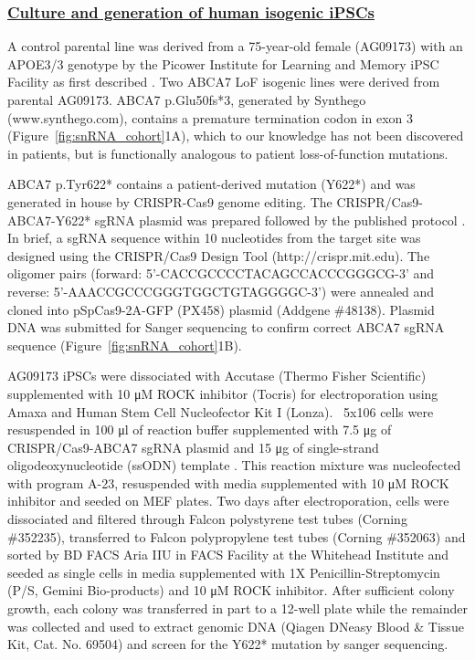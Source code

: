 \subsubsection{\underline{Culture and generation of human isogenic iPSCs}} 

A control parental line was derived from a 75-year-old female (AG09173) with an APOE3/3 genotype by the Picower Institute for Learning and Memory iPSC Facility as first described \supercite{Lin2018-ma}. Two ABCA7 LoF isogenic lines were derived from parental AG09173. ABCA7 p.Glu50fs*3, generated by Synthego (www.synthego.com), contains a premature termination codon in exon 3 (Figure~\ref{fig:snRNA_cohort}1A), which to our knowledge has not been discovered in patients, but is functionally analogous to patient loss-of-function mutations.

ABCA7 p.Tyr622* contains a patient-derived mutation (Y622*) \supercite{De_Roeck2019-bs} and was generated in house by CRISPR-Cas9 genome editing. The CRISPR/Cas9-ABCA7-Y622* sgRNA plasmid was prepared followed by the published protocol \supercite{Ran2013-sf}. In brief, a sgRNA sequence within 10 nucleotides from the target site was designed using the CRISPR/Cas9 Design Tool (http://crispr.mit.edu). The oligomer pairs (forward: 5’-CACCGCCCCTACAGCCACCCGGGCG-3’ and reverse: 5’-AAACCGCCCGGGTGGCTGTAGGGGC-3’) were annealed and cloned into pSpCas9-2A-GFP (PX458) plasmid (Addgene \#48138). Plasmid DNA was submitted for Sanger sequencing to confirm correct ABCA7 sgRNA sequence (Figure~\ref{fig:snRNA_cohort}1B).

AG09173 iPSCs were dissociated with Accutase (Thermo Fisher Scientific) supplemented with 10 μM ROCK inhibitor (Tocris) for electroporation using Amaxa and Human Stem Cell Nucleofector Kit I (Lonza). ~5x106 cells were resuspended in 100 μl of reaction buffer supplemented with 7.5 μg of CRISPR/Cas9-ABCA7 sgRNA plasmid and 15 μg of single-strand oligodeoxynucleotide (ssODN) template . This reaction mixture was nucleofected with program A-23, resuspended with media supplemented with 10 μM ROCK inhibitor and seeded on MEF plates. Two days after electroporation, cells were dissociated and filtered through Falcon polystyrene test tubes (Corning \#352235), transferred to Falcon polypropylene test tubes (Corning \#352063) and sorted by BD FACS Aria IIU in FACS Facility at the Whitehead Institute and seeded as single cells in media supplemented with 1X Penicillin-Streptomycin (P/S, Gemini Bio-products) and 10 μM ROCK inhibitor. After sufficient colony growth, each colony was transferred in part to a 12-well plate while the remainder was collected and used to extract genomic DNA (Qiagen DNeasy Blood & Tissue Kit, Cat. No. 69504) and screen for the Y622* mutation by sanger sequencing.

